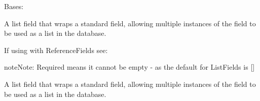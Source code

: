 \documentclass[letterpaper,10pt,english]{sphinxmanual}
\begin{document}
\begin{fulllineitems}
\label{\detokenize{test:test.Test}}
Bases: 

\begin{fulllineitems}
\label{\detokenize{test:test.Test.append_flashcard}}
\end{fulllineitems}


\begin{fulllineitems}
\label{\detokenize{test:test.Test.append_item}}
\end{fulllineitems}


\begin{fulllineitems}
\label{\detokenize{test:test.Test.flashcard_responses}}
A list field that wraps a standard field, allowing multiple instances
of the field to be used as a list in the database.

If using with ReferenceFields see: 

\begin{sphinxadmonition}{note}{Note:}
Required means it cannot be empty - as the default for ListFields is {[}{]}
\end{sphinxadmonition}

\end{fulllineitems}


\begin{fulllineitems}
\label{\detokenize{test:test.Test.generate_test}}
\end{fulllineitems}


\begin{fulllineitems}
\label{\detokenize{test:test.Test.item_responses}}
A list field that wraps a standard field, allowing multiple instances
of the field to be used as a list in the database.


\end{fulllineitems}
\end{fulllineitems}
\end{document}
